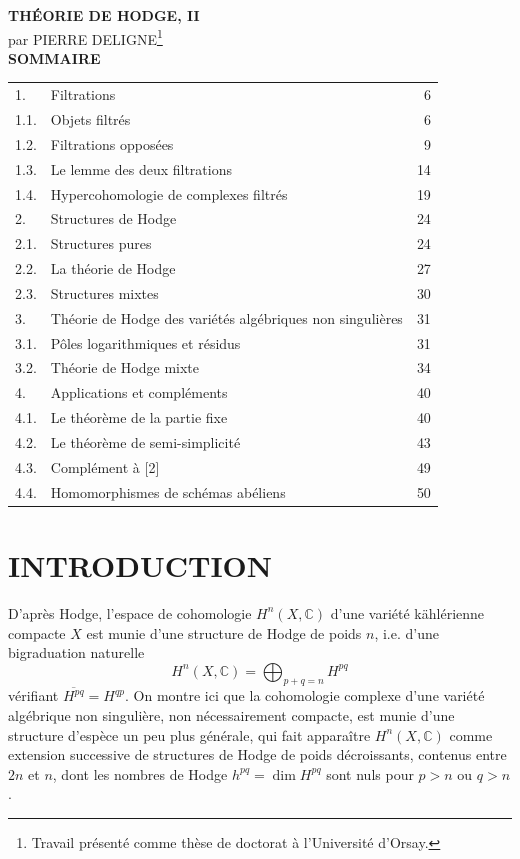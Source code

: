 \documentclass[10pt]{article}
\newcommand{\C}{\mathbb C}
\newcommand{\fg}{\guillemotright}
\newcommand{\og}{\guillemotleft}
\begin{document}
\begin{center}
{\Large\bfseries THÉORIE DE HODGE, II}\\[0.4em]
{\normalsize par PIERRE DELIGNE{\renewcommand{\thefootnote}{(\arabic{footnote})}\footnote{Travail présenté comme thèse de doctorat à l'Université d'Orsay.}}}\\[1.3em]
{\bfseries SOMMAIRE}
\end{center}

\begin{center}
\begin{tabular}{llr}
1. & Filtrations & 6\\
1.1. & Objets filtrés & 6\\
1.2. & Filtrations opposées & 9\\
1.3. & Le lemme des deux filtrations & 14\\
1.4. & Hypercohomologie de complexes filtrés & 19\\
2. & Structures de Hodge & 24\\
2.1. & Structures pures & 24\\
2.2. & La théorie de Hodge & 27\\
2.3. & Structures mixtes & 30\\
3. & Théorie de Hodge des variétés algébriques non singulières & 31\\
3.1. & Pôles logarithmiques et résidus & 31\\
3.2. & Théorie de Hodge mixte & 34\\
4. & Applications et compléments & 40\\
4.1. & Le théorème de la partie fixe & 40\\
4.2. & Le théorème de semi-simplicité & 43\\
4.3. & Complément à [2] & 49\\
4.4. & Homomorphismes de schémas abéliens & 50
\end{tabular}
\end{center}

\section*{INTRODUCTION}

D'après Hodge, l'espace de cohomologie $H^n(X,\C)$ d'une variété kählérienne compacte $X$ est munie d'une \og structure de Hodge\fg{} de poids $n$, i.e. d'une bigraduation naturelle
\[
H^n(X,\C)=\bigoplus_{p+q=n}H^{pq}
\]
vérifiant $\overline{H^{pq}}=H^{qp}$. On montre ici que la cohomologie complexe d'une variété algébrique non singulière, non nécessairement compacte, est munie d'une structure d'espèce un peu plus générale, qui fait apparaître $H^n(X,\C)$ comme \og extension successive\fg{} de structures de Hodge de poids décroissants, contenus entre $2n$ et $n$, dont les nombres de Hodge $h^{pq}=\dim H^{pq}$ sont nuls pour $p>n$ ou $q>n$.
\end{document}
